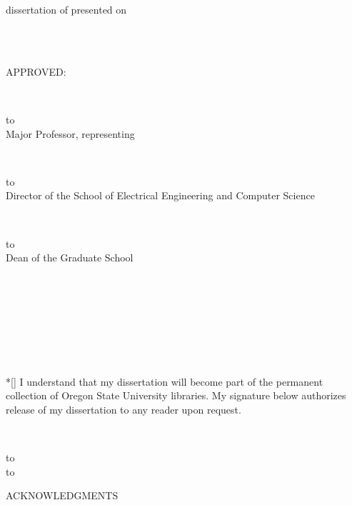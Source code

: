 \documentclass[12pt,letterpaper]{gthesis2}  %
\begin{document}
%
\clearpage
%
\DisplayCopyright %
%
%
\DisplayTitlePage %
%
%
%
\thispagestyle{empty} {\baselineskip=14.5pt
\def\ruleline{\hbox to \hsize{\hrulefill}\\[-2ex]}
\noindent \underline{\mydegree} dissertation of \underline{\myname}
presented on \underline{\myday}
\strut\\
\strut\\
APPROVED:\\
\strut\\
\strut
\ruleline
Major Professor, representing \mymajor\\
\strut\\
\strut
\ruleline
Director of the School of Electrical Engineering and Computer Science \\
\strut\\
\strut
\ruleline
Dean of the Graduate School\\
\strut\\
\strut\\
\strut\\
\strut\\\\*[\baselineskip]
\noindent I understand that my dissertation will become part of the permanent
collection of Oregon State University libraries. My signature
below authorizes release of my dissertation to any reader upon request.\\
\strut\\
\strut
\ruleline \hbox to \textwidth{\hfil \myname, Author \hfil} }
%
%
%
%
%
\clearpage
\thispagestyle{empty}
\begin{center}
ACKNOWLEDGMENTS
\end{center}
%
%
\end{document}
